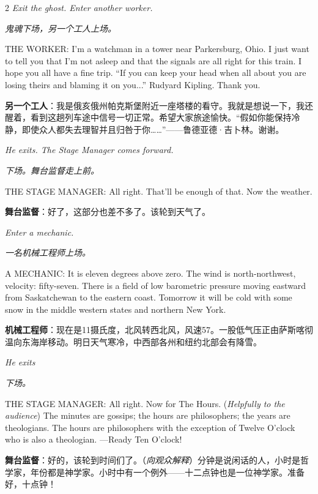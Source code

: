 \documentclass[lang=cn,newtx,10pt,scheme=chinese]{elegantbook}
\newcommand{\pair}[2]{%
\switchcolumn* #2\par
\switchcolumn  #1\par
}
\begin{document}
\begin{paracol}{2}
\pair{
    \textit{鬼魂下场，另一个工人上场。}
}{
    \textit{Exit the ghost. Enter another worker.}
    \newline
    \newline
}

\pair{
    \textbf{另一个工人}：我是俄亥俄州帕克斯堡附近一座塔楼的看守。我就是想说一下，我还醒着，看到这趟列车途中信号一切正常。希望大家旅途愉快。“假如你能保持冷静，即使众人都失去理智并且归咎于你……”——鲁德亚德·吉卜林。谢谢。
}{
    THE WORKER: I'm a watchman in a tower near Parkersburg, Ohio. I just want to tell you that I'm not asleep and that the signals are all right for this train. I hope you all have a fine trip. “If you can keep your head when all about you are losing theirs and blaming it on you...” Rudyard Kipling. Thank you.
    \newline
    \newline
}

\pair{
    \textit{下场。舞台监督走上前。}
}{
    \textit{He exits. The Stage Manager comes forward.}
    \newline
    \newline
}

\pair{
    \textbf{舞台监督}：好了，这部分也差不多了。该轮到天气了。
}{
    THE STAGE MANAGER: All right. That'll be enough of that. Now the weather.
}

\pair{
    \textit{一名机械工程师上场。}
}{
    \textit{Enter a mechanic.}
}

\pair{
    \textbf{机械工程师}：现在是11摄氏度，北风转西北风，风速57。一股低气压正由萨斯喀彻温向东海岸移动。明日天气寒冷，中西部各州和纽约北部会有降雪。
}{
    A MECHANIC: It is eleven degrees above zero. The wind is north-northwest, velocity: fifty-seven. There is a field of low barometric pressure moving eastward from Saskatchewan to the eastern coast. Tomorrow it will be cold with some snow in the middle western states and northern New York.
    \newline
}

\pair{
    \textit{下场。}
}{
    \textit{He exits}
    \newline
}

\pair{
    \textbf{舞台监督}：好的，该轮到时间们了。（\textit{向观众解释}）分钟是说闲话的人，小时是哲学家，年份都是神学家。小时中有一个例外——十二点钟也是一位神学家。准备好，十点钟！
}{
    THE STAGE MANAGER: All right. Now for The Hours. (\textit{Helpfully to the audience}) The minutes are gossips; the hours are philosophers; the years are theologians. The hours are philosophers with the exception of Twelve O'clock who is also a theologian. —Ready Ten O'clock!
    \newline
}


\end{paracol}
\end{document}
